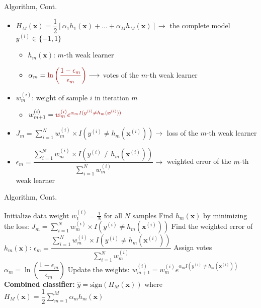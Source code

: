 \documentclass[serif, aspectratio=169]{beamer}
\begin{document}
\begin{frame}{Algorithm, Cont.}
    \begin{itemize}
        \itemsep1em
        \justifying
        \item $H_M(\boldsymbol{x}) = \dfrac{1}{2}[\alpha_1h_1(\boldsymbol{x})+\dots+\alpha_Mh_M(\boldsymbol{x})] \longrightarrow$ the complete model \hfill $y^{(i)} \in \{-1, 1\}$
        \smallskip
        \begin{itemize}
            \itemsep0.5em
            \item $h_m(\boldsymbol{x})$: $m$-th weak learner
            \item $\alpha_m = \textcolor{deepred}{\ln\left(\dfrac{1 - \epsilon_m}{\epsilon_m}\right)} \longrightarrow$ votes of the $m$-th weak learner
        \end{itemize}
        \item $w_m^{(i)}$: weight of sample $i$ in iteration $m$
        \smallskip
        \begin{itemize}
            \item $w_{m+1}^{(i)} = \textcolor{deepred}{w_m^{(i)} e^{\alpha_m I(y^{(i)} \neq h_m(\boldsymbol{x}^{(i)}))}}$
        \end{itemize}
        \item $J_m = \displaystyle\sum_{i=1}^N w_m^{(i)} \times I(y^{(i)} \neq h_m(\boldsymbol{x}^{(i)})) \longrightarrow$ loss of the $m$-th weak learner
        \item $\epsilon_m = \dfrac{\sum_{i=1}^N w_m^{(i)} \times I(y^{(i)} \neq h_m(\boldsymbol{x}^{(i)}))}{\sum_{i=1}^N w_m^{(i)}} \longrightarrow$ weighted error of the $m$-th weak learner
    \end{itemize}
\end{frame}

\begin{frame}{Algorithm, Cont.}
    \begin{algorithm}[H]
    \caption{AdaBoost}\label{alg:AdaBoost}
    \begin{algorithmic}[1]
        \State Initialize data weight $w_1^{(i)} = \frac{1}{N}$ for all $N$ samples
            \State Find $h_m(\boldsymbol{x})$ by minimizing the loss: \hfill $J_m = \displaystyle\sum_{i=1}^N w_m^{(i)} \times I(y^{(i)} \neq h_m(\boldsymbol{x}^{(i)}))$
            \State Find the weighted error of $h_m(\boldsymbol{x})$: \hfill $\epsilon_m = \dfrac{\sum_{i=1}^N w_m^{(i)} \times I(y^{(i)} \neq h_m(\boldsymbol{x}^{(i)}))}{\sum_{i=1}^N w_m^{(i)}}$
            \State Assign votes $\alpha_m = \ln\left(\dfrac{1 - \epsilon_m}{\epsilon_m}\right)$
            \State Update the weights: \hfill $w_{m+1}^{(i)} = w_m^{(i)} e^{\alpha_m I(y^{(i)} \neq h_m(\boldsymbol{x}^{(i)}))}$
        \EndFor
        \State \textbf{Combined classifier:} $\hat{y} = \text{sign}(H_M(\boldsymbol{x}))$ where $H_M(\boldsymbol{x}) = \dfrac{1}{2}\sum_{m=1}^M \alpha_m h_m(\boldsymbol{x})$
    \end{algorithmic}
    \end{algorithm}
\end{frame}
\end{document}
